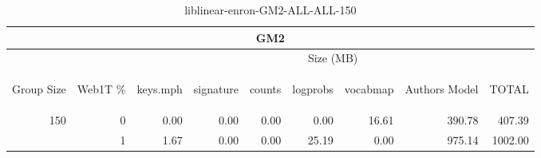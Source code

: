 \begin{center}
\begin{table}[htbp]
\begin{tabular}{ | r | r | r | r | r | r | r | r | r |}
\hline
\multicolumn{9}{|c|}{GM2}\\
\hline
 & & \multicolumn{7}{|c|}{Size (MB)}\\ \cline{3-9}
\begin{sideways}Group Size\end{sideways} & \begin{sideways}Web1T \% \end{sideways} & \begin{sideways}keys.mph\end{sideways} & \begin{sideways}signature\end{sideways} & \begin{sideways}counts\end{sideways} & \begin{sideways}logprobs\end{sideways} & \begin{sideways}vocabmap\end{sideways} & \begin{sideways}Authors Model \end{sideways} & \begin{sideways}TOTAL\end{sideways}\\
\hline
\multirow{1}{*}{150}
 & 0 & 0.00 & 0.00 & 0.00 & 0.00 & 16.61 & 390.78 & 407.39\\ \cline{2-9}
 & 1 & 1.67 & 0.00 & 0.00 & 25.19 & 0.00 & 975.14 & 1002.00\\ \cline{2-9}
\hline
\end{tabular}
\caption{liblinear-enron-GM2-ALL-ALL-150}
\label{table:liblinear-enron-GM2-ALL-ALL-150}
\end{table}
\end{center}

